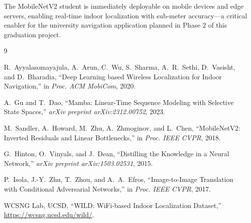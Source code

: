 \documentclass[11pt,a4paper]{article}
\begin{document}
The MobileNetV2 student is immediately deployable on mobile devices and edge servers, enabling real-time indoor localization with sub-meter accuracy---a critical enabler for the university navigation application planned in Phase 2 of this graduation project.

\begin{thebibliography}{9}

R.~Ayyalasomayajula, A.~Arun, C.~Wu, S.~Sharma, A.~R.~Sethi, D.~Vasisht, and D.~Bharadia,
``Deep Learning based Wireless Localization for Indoor Navigation,''
in \textit{Proc. ACM MobiCom}, 2020.

A.~Gu and T.~Dao,
``Mamba: Linear-Time Sequence Modeling with Selective State Spaces,''
\textit{arXiv preprint arXiv:2312.00752}, 2023.

M.~Sandler, A.~Howard, M.~Zhu, A.~Zhmoginov, and L.~Chen,
``MobileNetV2: Inverted Residuals and Linear Bottlenecks,''
in \textit{Proc. IEEE CVPR}, 2018.

G.~Hinton, O.~Vinyals, and J.~Dean,
``Distilling the Knowledge in a Neural Network,''
\textit{arXiv preprint arXiv:1503.02531}, 2015.

P.~Isola, J.-Y.~Zhu, T.~Zhou, and A.~A.~Efros,
``Image-to-Image Translation with Conditional Adversarial Networks,''
in \textit{Proc. IEEE CVPR}, 2017.

WCSNG Lab, UCSD,
``WILD: WiFi-based Indoor Localization Dataset,''
\url{https://wcsng.ucsd.edu/wild/}.

\end{thebibliography}
\end{document}
